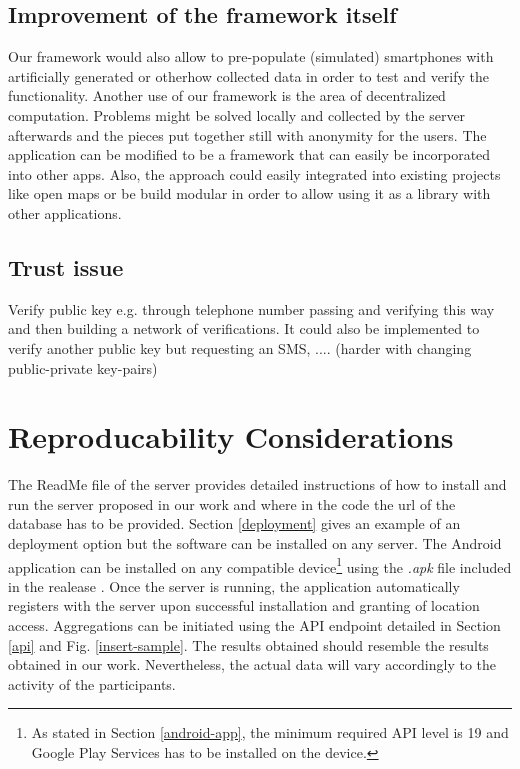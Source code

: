 \subsection{Improvement of the framework itself}
Our framework would also allow to pre-populate (simulated) smartphones with artificially generated or otherhow collected data in order to test and verify the functionality.
Another use of our framework is the area of decentralized computation. Problems might be solved locally and collected by the server afterwards and the pieces put together still with anonymity for the users.
The application can be modified to be a framework that can easily be incorporated into other apps. Also, the approach could easily integrated into existing projects like open maps or be build modular in order to allow using it as a library with other applications.

\subsection{Trust issue}
Verify public key e.g. through telephone number passing and verifying this way and then building a network of verifications. It could also be implemented to verify another public key but requesting an SMS, .... (harder with changing public-private key-pairs)

\section{Reproducability Considerations}
The ReadMe file of the server \parencite{readme-server} provides detailed instructions of how to install and run the server proposed in our work and where in the code the url of the database has to be provided. Section \ref{deployment} gives an example of an deployment option but the software can be installed on any server. The Android application can be installed on any compatible device\footnote{As stated in Section \ref{android-app}, the minimum required API level is 19 and Google Play Services has to be installed on the device.} using the \textit{.apk} file included in the realease \parencite{final-version-app}. Once the server is running, the application automatically registers with the server upon successful installation and granting of location access. Aggregations can be initiated using the API endpoint detailed in Section \ref{api} and Fig. \ref{insert-sample}.
The results obtained should resemble the results obtained in our work. Nevertheless, the actual data will vary accordingly to the activity of the participants.